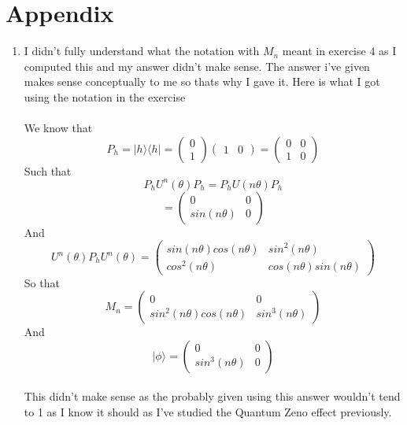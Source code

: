 \documentclass[12pt]{article}
\newcommand{\ket}[1]{\vert{#1}\rangle}
\newcommand{\bra}[1]{\langle{#1}\vert}
\begin{document}
\section{Appendix}
\begin{enumerate}
    \item I didn't fully understand what the notation with $M_n$ meant in exercise 4 as I computed this and my answer didn't make sense. The answer i've given makes sense conceptually to me so thats why I gave it. Here is what I got using the notation in the exercise \\
    \\
    We know that 
    $$ P_h = \ket{h} \bra{h} = \left(\begin{array}{cc} 0 \\ 1\end{array}\right) \left(\begin{array}{cc} 1 &0\end{array}\right) = \left(\begin{array}{cc} 0 & 0 \\ 1 & 0\end{array}\right)$$
    Such that 
    $$ P_h U^n (\theta) P_h = P_h U(n \theta) P_h $$
    $$ = \left(\begin{array}{cc} 0 & 0 \\ sin(n \theta) & 0\end{array}\right) $$
    And 
    $$ U^n (\theta) P_h U^n (\theta) = \left(\begin{array}{cc} sin(n \theta)cos(n \theta) & sin^2(n \theta) \\ cos^2 (n \theta) & cos(n \theta)sin(n \theta)\end{array}\right)$$
    So that 
    $$ M_n = \left(\begin{array}{cc} 0 & 0 \\ sin^2 (n \theta)cos(n \theta) & sin^3(n \theta) \end{array}\right)$$
    And 
    $$ \ket{\phi } = \left(\begin{array}{cc} 0 & 0 \\ sin^3 (n \theta) & 0 \end{array}\right)$$
    \\
    This didn't make sense as the probably given using this answer wouldn't tend to 1 as I know it should as I've studied the Quantum Zeno effect previously. 
\end{enumerate}
\end{document}

